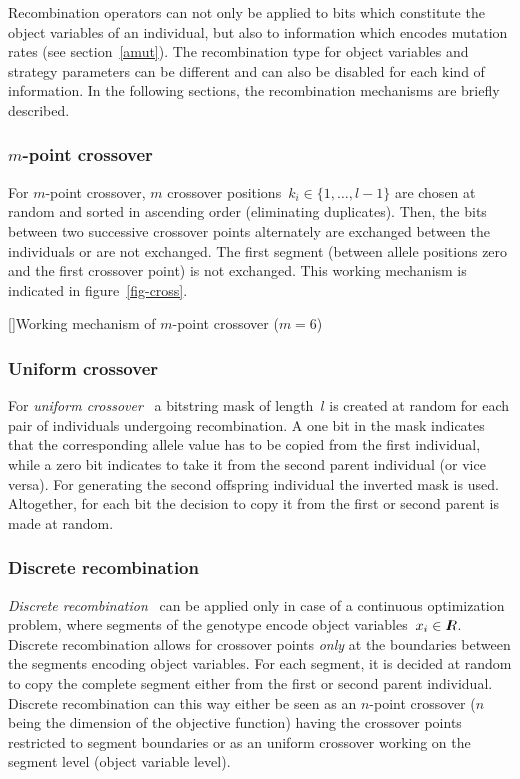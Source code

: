 Recombination operators can not only be applied to bits which constitute the
object variables of an individual, but also to information which encodes 
mutation rates (see section~\ref{amut}).
The recombination type for object variables and strategy parameters
can be different and can also be disabled for each kind of information.
In the following sections, the recombination mechanisms are briefly
described.

\subsubsection{$m$-point crossover}

For $m$-point crossover, $m$ crossover positions~$k_i \in \{1,\ldots,l-1\}$
are chosen at random and sorted in ascending order (eliminating duplicates).
Then, the bits between two successive crossover points alternately are 
exchanged between the individuals or are not exchanged.
The first segment (between allele positions zero and the first crossover point)
is not exchanged.
This working mechanism is indicated in figure~\ref{fig-cross}.

[]{Working mechanism of $m$-point crossover ($m=6$)}

\subsubsection{Uniform crossover}

For {\em uniform crossover\/}~\cite{Sys89} a bitstring mask of 
length~$l$ is created at random for each pair of individuals undergoing 
recombination.
A one bit in the mask indicates that the corresponding allele value has
to be copied from the first individual, while a zero bit indicates to take
it from the second parent individual (or vice versa).
For generating the second offspring individual the inverted mask is used.
Altogether, for each bit the decision to copy it from the first or second
parent is made at random.

\subsubsection{Discrete recombination}

{\em Discrete recombination\/}~\cite{Schw81} can be applied only in case of
a continuous optimization problem, where segments of the genotype encode
object variables~$x_i \in \Real$.
Discrete recombination allows for crossover points {\em only\/} at the
boundaries between the segments encoding object variables.
For each segment, it is decided at random to copy the complete
segment either from the first or second parent individual.
Discrete recombination can this way either be seen as an
$n$-point crossover ($n$ being the dimension of the objective function)
having the crossover points restricted to segment boundaries or as an
uniform crossover working on the segment level (object variable level).

